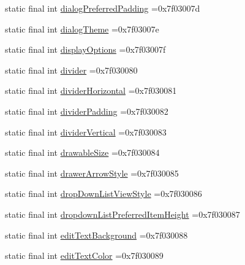 \begin{DoxyCompactItemize}
\item 
static final int \mbox{\hyperlink{classbr_1_1unb_1_1cic_1_1mp_1_1marketmaster_1_1R_1_1attr_a6e179496c3551676214c2fc011be5b42}{dialog\+Preferred\+Padding}} =0x7f03007d
\item 
static final int \mbox{\hyperlink{classbr_1_1unb_1_1cic_1_1mp_1_1marketmaster_1_1R_1_1attr_ae7da9ba682e3d8954272f76ae5283c0a}{dialog\+Theme}} =0x7f03007e
\item 
static final int \mbox{\hyperlink{classbr_1_1unb_1_1cic_1_1mp_1_1marketmaster_1_1R_1_1attr_a04f7253d411888bc53529fee99e2efcb}{display\+Options}} =0x7f03007f
\item 
static final int \mbox{\hyperlink{classbr_1_1unb_1_1cic_1_1mp_1_1marketmaster_1_1R_1_1attr_a26d3749e17acfc5db45ea5a657f153bb}{divider}} =0x7f030080
\item 
static final int \mbox{\hyperlink{classbr_1_1unb_1_1cic_1_1mp_1_1marketmaster_1_1R_1_1attr_ab443197f0929bd1c8462c74645cda597}{divider\+Horizontal}} =0x7f030081
\item 
static final int \mbox{\hyperlink{classbr_1_1unb_1_1cic_1_1mp_1_1marketmaster_1_1R_1_1attr_a51b0c23c4507fb538e0d0605e1f8436d}{divider\+Padding}} =0x7f030082
\item 
static final int \mbox{\hyperlink{classbr_1_1unb_1_1cic_1_1mp_1_1marketmaster_1_1R_1_1attr_a7a7b0eb43f40bd481ca17c2349479072}{divider\+Vertical}} =0x7f030083
\item 
static final int \mbox{\hyperlink{classbr_1_1unb_1_1cic_1_1mp_1_1marketmaster_1_1R_1_1attr_ac2f6c35621216850d77d51c638bd7bd8}{drawable\+Size}} =0x7f030084
\item 
static final int \mbox{\hyperlink{classbr_1_1unb_1_1cic_1_1mp_1_1marketmaster_1_1R_1_1attr_a40fd10dc30acb877960181c271fb575f}{drawer\+Arrow\+Style}} =0x7f030085
\item 
static final int \mbox{\hyperlink{classbr_1_1unb_1_1cic_1_1mp_1_1marketmaster_1_1R_1_1attr_ac09151ccedd5e7b6ead32f0ab846bee0}{drop\+Down\+List\+View\+Style}} =0x7f030086
\item 
static final int \mbox{\hyperlink{classbr_1_1unb_1_1cic_1_1mp_1_1marketmaster_1_1R_1_1attr_ac386de33420920ef173d44b07086bdac}{dropdown\+List\+Preferred\+Item\+Height}} =0x7f030087
\item 
static final int \mbox{\hyperlink{classbr_1_1unb_1_1cic_1_1mp_1_1marketmaster_1_1R_1_1attr_ae739c4ca09cc8e268d709827af6d0239}{edit\+Text\+Background}} =0x7f030088
\item 
static final int \mbox{\hyperlink{classbr_1_1unb_1_1cic_1_1mp_1_1marketmaster_1_1R_1_1attr_afd32d9529f66636c97a9308342202e7e}{edit\+Text\+Color}} =0x7f030089

\end{DoxyCompactItemize}
